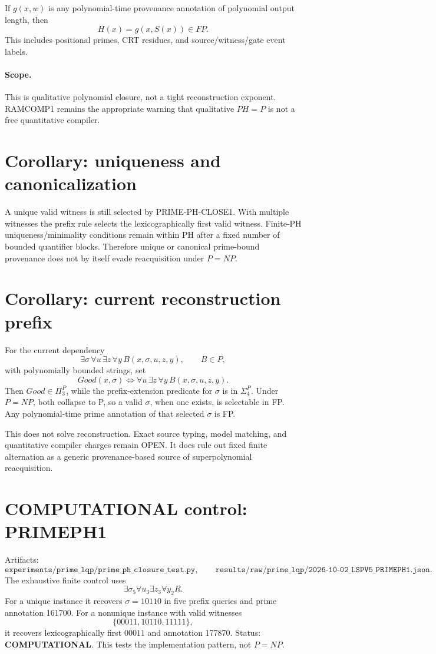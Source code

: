 \documentclass[11pt]{article}
\begin{document}
If \(g(x,w)\) is any polynomial-time provenance annotation of polynomial output length, then
\[
H(x)=g(x,S(x))\in FP.
\]
This includes positional primes, CRT residues, and source/witness/gate event labels.

\paragraph{Scope.}
This is qualitative polynomial closure, not a tight reconstruction exponent. RAMCOMP1 remains the
appropriate warning that qualitative \(PH=P\) is not a free quantitative compiler.

\section*{Corollary: uniqueness and canonicalization}
A unique valid witness is still selected by PRIME-PH-CLOSE1. With multiple witnesses the prefix
rule selects the lexicographically first valid witness. Finite-PH uniqueness/minimality conditions
remain within PH after a fixed number of bounded quantifier blocks. Therefore unique or canonical
prime-bound provenance does not by itself evade reacquisition under \(P=NP\).

\section*{Corollary: current reconstruction prefix}
For the current dependency
\[
\exists\sigma\,\forall u\,\exists z\,\forall y\,
B(x,\sigma,u,z,y),\qquad B\in P,
\]
with polynomially bounded strings, set
\[
Good(x,\sigma)\iff
\forall u\,\exists z\,\forall y\,B(x,\sigma,u,z,y).
\]
Then \(Good\in\Pi_3^P\), while the prefix-extension predicate for \(\sigma\) is in
\(\Sigma_4^P\). Under \(P=NP\), both collapse to P, so a valid \(\sigma\), when one
exists, is selectable in FP. Any polynomial-time prime annotation of that selected
\(\sigma\) is FP.

This does not solve reconstruction. Exact source typing, model matching, and quantitative compiler
charges remain OPEN. It does rule out fixed finite alternation as a generic provenance-based source
of superpolynomial reacquisition.

\section*{COMPUTATIONAL control: PRIMEPH1}
Artifacts:
\[
\texttt{experiments/prime\_lqp/prime\_ph\_closure\_test.py},
\qquad
\texttt{results/raw/prime\_lqp/2026-10-02\_LSPV5\_PRIMEPH1.json}.
\]
The exhaustive finite control uses
\[
\exists\sigma_5\forall u_3\exists z_3\forall y_2 R.
\]
For a unique instance it recovers \(\sigma=10110\) in five prefix queries and prime annotation
161700. For a nonunique instance with valid witnesses
\[
\{00011,10110,11111\},
\]
it recovers lexicographically first \(00011\) and annotation 177870.
Status: \textbf{COMPUTATIONAL}. This tests the implementation pattern, not \(P=NP\).
\end{document}
